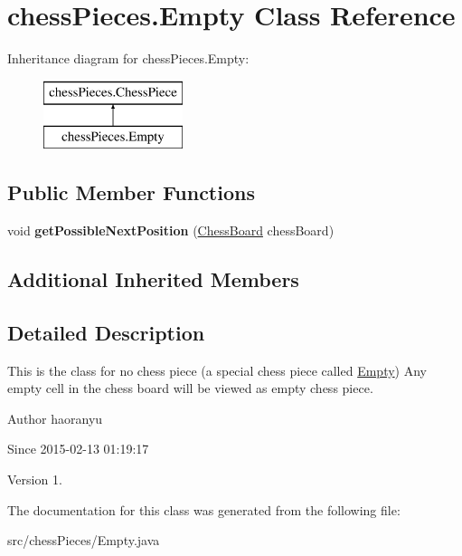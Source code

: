 \hypertarget{classchess_pieces_1_1_empty}{\section{chess\+Pieces.\+Empty Class Reference}
\label{classchess_pieces_1_1_empty}
}
Inheritance diagram for chess\+Pieces.\+Empty\+:\begin{figure}[H]
\begin{center}
\leavevmode
\includegraphics[height=2.000000cm]{classchess_pieces_1_1_empty}
\end{center}
\end{figure}
\subsection*{Public Member Functions}
\begin{DoxyCompactItemize}
\item 
\hypertarget{classchess_pieces_1_1_empty_ab8318f2c170f9957bfedc33d27c27868}{void {\bfseries get\+Possible\+Next\+Position} (\hyperlink{classmodels_1_1_chess_board}{Chess\+Board} chess\+Board)}\label{classchess_pieces_1_1_empty_ab8318f2c170f9957bfedc33d27c27868}

\end{DoxyCompactItemize}
\subsection*{Additional Inherited Members}


\subsection{Detailed Description}
This is the class for no chess piece (a special chess piece called \hyperlink{classchess_pieces_1_1_empty}{Empty}) Any empty cell in the chess board will be viewed as empty chess piece. \begin{DoxyAuthor}{Author}
haoranyu 
\end{DoxyAuthor}
\begin{DoxySince}{Since}
2015-\/02-\/13 01\+:19\+:17 
\end{DoxySince}
\begin{DoxyVersion}{Version}
1. 
\end{DoxyVersion}


The documentation for this class was generated from the following file\+:\begin{DoxyCompactItemize}
\item 
src/chess\+Pieces/Empty.\+java\end{DoxyCompactItemize}
